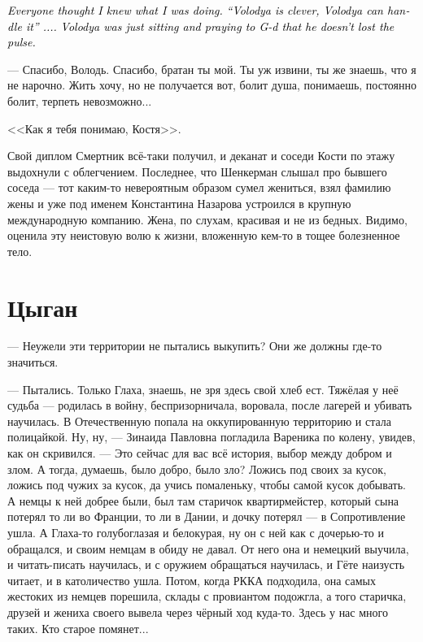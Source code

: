 \documentclass[a4paper,10pt,fleqn]{book}\usepackage{polyglossia}\setdefaultlanguage{english}\setotherlanguage{russian}\defaultfontfeatures{Ligatures=TeX,Mapping=tex-text} \usepackage{xcolor}\definecolor{lightgray}{HTML}{bbbbbb}\color{lightgray}\newcommand{\ml}[3]{\textcolor{black}{#3}}
\begin{document}
\ml{$0$}
{<<Все думали, что я знаю, что делаю, что у меня всё под контролем.}
{\textit{Everyone thought I knew what I was doing.}}
\ml{$0$}
{,,Володя умный, Володя разберётся``...}
{\textit{``Volodya is clever, Volodya can handle it'' ....}}
\ml{$0$}
{А Володя просто сидел и молился Б-гу, чтобы пульс не пропал>>.}
{\textit{Volodya was just sitting and praying to G-d that he doesn't lost the pulse.}}

--- Спасибо, Володь.
Спасибо, братан ты мой.
Ты уж извини, ты же знаешь, что я не нарочно.
Жить хочу, но не получается вот, болит душа, понимаешь, постоянно болит, терпеть невозможно...

<<Как я тебя понимаю, Костя>>.

Свой диплом Смертник всё-таки получил, и деканат и соседи Кости по этажу выдохнули с облегчением.
Последнее, что Шенкерман слышал про бывшего соседа --- тот каким-то невероятным образом сумел жениться, взял фамилию жены и уже под именем Константина Назарова устроился в крупную международную компанию.
Жена, по слухам, красивая и не из бедных.
Видимо, оценила эту неистовую волю к жизни, вложенную кем-то в тощее болезненное тело.

\section{Цыган}

--- Неужели эти территории не пытались выкупить?
Они же должны где-то значиться.

--- Пытались.
Только Глаха, знаешь, не зря здесь свой хлеб ест.
Тяжёлая у неё судьба --- родилась в войну, беспризорничала, воровала, после лагерей и убивать научилась.
В Отечественную попала на оккупированную территорию и стала полицайкой.
Ну, ну, --- Зинаида Павловна погладила Вареника по колену, увидев, как он скривился.
--- Это сейчас для вас всё история, выбор между добром и злом.
А тогда, думаешь, было добро, было зло?
Ложись под своих за кусок, ложись под чужих за кусок, да учись помаленьку, чтобы самой кусок добывать.
А немцы к ней добрее были, был там старичок квартирмейстер, который сына потерял то ли во Франции, то ли в Дании, и дочку потерял --- в Сопротивление ушла.
А Глаха-то голубоглазая и белокурая, ну он с ней как с дочерью-то и обращался, и своим немцам в обиду не давал.
От него она и немецкий выучила, и читать-писать научилась, и с оружием обращаться научилась, и Гёте наизусть читает, и в католичество ушла.
Потом, когда РККА подходила, она самых жестоких из немцев порешила, склады с провиантом подожгла, а того старичка, друзей и жениха своего вывела через чёрный ход куда-то.
Здесь у нас много таких.
Кто старое помянет...
\end{document}

